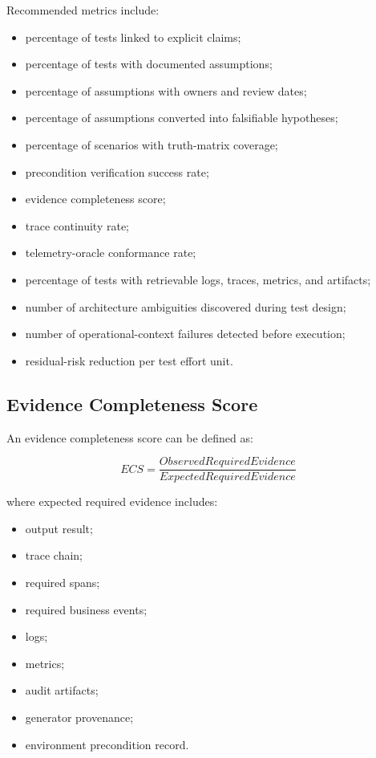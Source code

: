 \documentclass[11pt,a4paper]{article}
\begin{document}
Recommended metrics include:
\begin{itemize}
\item percentage of tests linked to explicit claims;
\item percentage of tests with documented assumptions;
\item percentage of assumptions with owners and review dates;
\item percentage of assumptions converted into falsifiable hypotheses;
\item percentage of scenarios with truth-matrix coverage;
\item precondition verification success rate;
\item evidence completeness score;
\item trace continuity rate;
\item telemetry-oracle conformance rate;
\item percentage of tests with retrievable logs, traces, metrics, and artifacts;
\item number of architecture ambiguities discovered during test design;
\item number of operational-context failures detected before execution;
\item residual-risk reduction per test effort unit.
\end{itemize}

\subsection{Evidence Completeness Score}

An evidence completeness score can be defined as:

\[
ECS = \frac{ObservedRequiredEvidence}{ExpectedRequiredEvidence}
\]

where expected required evidence includes:
\begin{itemize}
\item output result;
\item trace chain;
\item required spans;
\item required business events;
\item logs;
\item metrics;
\item audit artifacts;
\item generator provenance;
\item environment precondition record.
\end{itemize}
\end{document}
